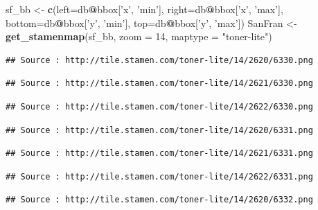 \documentclass[]{book}
\newenvironment{Shaded}{\begin{snugshade}}{\end{snugshade}}
\newcommand{\KeywordTok}[1]{\textcolor[rgb]{0.13,0.29,0.53}{\textbf{#1}}}
\newcommand{\DataTypeTok}[1]{\textcolor[rgb]{0.13,0.29,0.53}{#1}}
\newcommand{\DecValTok}[1]{\textcolor[rgb]{0.00,0.00,0.81}{#1}}
\newcommand{\StringTok}[1]{\textcolor[rgb]{0.31,0.60,0.02}{#1}}
\newcommand{\OperatorTok}[1]{\textcolor[rgb]{0.81,0.36,0.00}{\textbf{#1}}}
\newcommand{\NormalTok}[1]{#1}
\begin{document}
\begin{Shaded}
\begin{Highlighting}[]
\NormalTok{sf_bb <-}\StringTok{ }\KeywordTok{c}\NormalTok{(}\DataTypeTok{left=}\NormalTok{db}\OperatorTok{@}\NormalTok{bbox[}\StringTok{'x'}\NormalTok{, }\StringTok{'min'}\NormalTok{],}
           \DataTypeTok{right=}\NormalTok{db}\OperatorTok{@}\NormalTok{bbox[}\StringTok{'x'}\NormalTok{, }\StringTok{'max'}\NormalTok{],}
           \DataTypeTok{bottom=}\NormalTok{db}\OperatorTok{@}\NormalTok{bbox[}\StringTok{'y'}\NormalTok{, }\StringTok{'min'}\NormalTok{],}
           \DataTypeTok{top=}\NormalTok{db}\OperatorTok{@}\NormalTok{bbox[}\StringTok{'y'}\NormalTok{, }\StringTok{'max'}\NormalTok{])}
\NormalTok{SanFran <-}\StringTok{ }\KeywordTok{get_stamenmap}\NormalTok{(sf_bb, }
                         \DataTypeTok{zoom =} \DecValTok{14}\NormalTok{, }
                         \DataTypeTok{maptype =} \StringTok{"toner-lite"}\NormalTok{)}
\end{Highlighting}
\end{Shaded}

\begin{verbatim}
## Source : http://tile.stamen.com/toner-lite/14/2620/6330.png
\end{verbatim}

\begin{verbatim}
## Source : http://tile.stamen.com/toner-lite/14/2621/6330.png
\end{verbatim}

\begin{verbatim}
## Source : http://tile.stamen.com/toner-lite/14/2622/6330.png
\end{verbatim}

\begin{verbatim}
## Source : http://tile.stamen.com/toner-lite/14/2620/6331.png
\end{verbatim}

\begin{verbatim}
## Source : http://tile.stamen.com/toner-lite/14/2621/6331.png
\end{verbatim}

\begin{verbatim}
## Source : http://tile.stamen.com/toner-lite/14/2622/6331.png
\end{verbatim}

\begin{verbatim}
## Source : http://tile.stamen.com/toner-lite/14/2620/6332.png
\end{verbatim}
\end{document}
